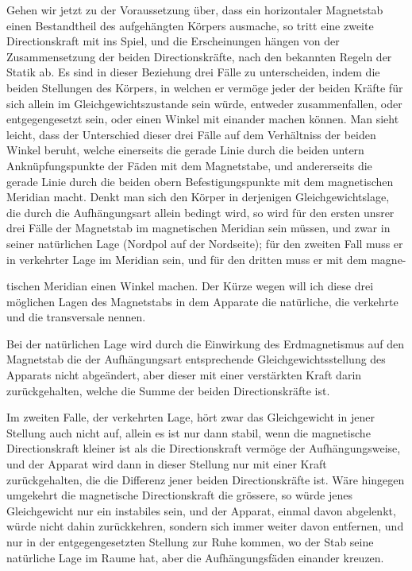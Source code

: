 Gehen wir jetzt zu der Voraussetzung über, dass ein horizontaler Magnetstab einen Bestandtheil des aufgehängten Körpers ausmache, so tritt eine zweite Directionskraft mit ins Spiel, und die Erscheinungen hängen von der Zusammensetzung der beiden Directionskräfte, nach den bekannten Regeln der Statik ab. Es sind in dieser Beziehung drei Fälle zu unterscheiden, indem die beiden Stellungen des Körpers, in welchen er vermöge jeder der beiden Kräfte für sich allein im Gleichgewichtszustande sein würde, entweder zusammenfallen, oder entgegengesetzt sein, oder einen Winkel mit einander machen können. Man sieht leicht, dass der Unterschied dieser drei Fälle auf dem Verhältniss der beiden Winkel beruht, welche einerseits die gerade Linie durch die beiden untern Anknüpfungspunkte der Fäden mit dem Magnetstabe, und andererseits die gerade Linie durch die beiden obern Befestigungspunkte mit dem magnetischen Meridian macht. Denkt man sich den Körper in derjenigen Gleichgewichtslage, die durch die Aufhängungsart allein bedingt wird, so wird für den ersten unsrer drei Fälle der Magnetstab im magnetischen Meridian sein müssen, und zwar in seiner natürlichen Lage (Nordpol auf der Nordseite); für den zweiten Fall muss er in verkehrter Lage im Meridian sein, und für den dritten muss er mit dem magne-
\par\clearpage
{}
\noindent tischen Meridian einen Winkel machen. Der Kürze wegen will ich diese drei möglichen Lagen des Magnetstabs in dem Apparate die natürliche, die verkehrte und die transversale nennen.

Bei der natürlichen Lage wird durch die Einwirkung des Erdmagnetismus auf den Magnetstab die der Aufhängungsart entsprechende Gleichgewichtsstellung des Apparats nicht abgeändert, aber dieser mit einer verstärkten Kraft darin zurückgehalten, welche die Summe der beiden Directionskräfte ist.

Im zweiten Falle, der verkehrten Lage, hört zwar das Gleichgewicht in jener Stellung auch nicht auf, allein es ist nur dann stabil, wenn die magnetische Directionskraft kleiner ist als die Directionskraft vermöge der Aufhängungsweise, und der Apparat wird dann in dieser Stellung nur mit einer Kraft zurückgehalten, die die Differenz jener beiden Directionskräfte ist. Wäre hingegen umgekehrt die magnetische Directionskraft die grössere, so würde jenes Gleichgewicht nur ein instabiles sein, und der Apparat, einmal davon abgelenkt, würde nicht dahin zurückkehren, sondern sich immer weiter davon entfernen, und nur in der entgegengesetzten Stellung zur Ruhe kommen, wo der Stab seine natürliche Lage im Raume hat, aber die Aufhängungsfäden einander kreuzen.

